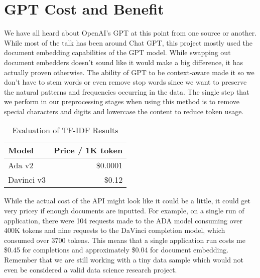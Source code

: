 \chapter{GPT Cost and Benefit}
\label{ch:gpt_costbenefit}

We have all heard about OpenAI's GPT at this point from one source or another. While most of the talk has been around Chat GPT, this project mostly used the document embedding capabilities of the GPT model. While swapping out document embedders doesn't sound like it would make a big difference, it has actually proven otherwise. The ability of GPT to be context-aware made it so we don't have to stem words or even remove stop words since we want to preserve the natural patterns and frequencies occurring in the data. The single step that we perform in our preprocessing stages when using this method is to remove special characters and digits and lowercase the content to reduce token usage.

\begin{table}
  \centering
  \label{tab:tfidf_outcomes}
  \begin{tabular}{ | l | r | }
    \hline
    \textbf{Model} & \textbf{Price / 1K token} \\
    \hline
    Ada v2 & \$0.0001 \\
    \hline
    Davinci v3 & \$0.12 \\
    \hline
  \end{tabular}
  \caption{Evaluation of TF-IDF Results}
\end{table}


While the actual cost of the API might look like it could be a little, it could get very pricey if enough documents are inputted. For example, on a single run of application, there were 104 requests made to the ADA model consuming over 400K tokens and nine requests to the DaVinci completion model, which consumed over 3700 tokens. This means that a single application run costs me \$0.45 for completions and approximately \$0.04 for document embedding. Remember that we are still working with a tiny data sample which would not even be considered a valid data science research project.